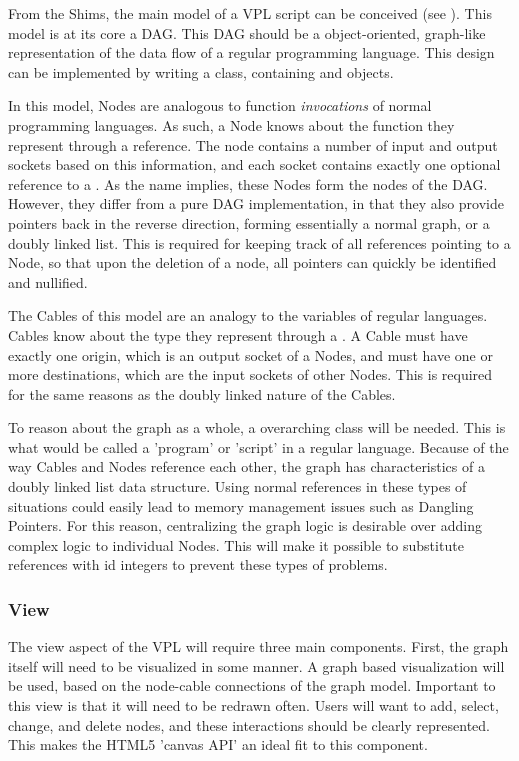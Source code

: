 From the Shims, the main model of a VPL script can be conceived (see ). 
This model is at its core a \ac{DAG}. 
This \ac{DAG} should be a object-oriented, graph-like representation of the data flow of a regular programming language. 
This design can be implemented by writing a  class, containing  and  objects. 

In this model, Nodes are analogous to function \emph{invocations} of normal programming languages. 
As such, a Node knows about the function they represent through a  reference. 
The node contains a number of input and output sockets based on this information, and each socket contains exactly one optional reference to a .  
As the name implies, these Nodes form the nodes of the DAG. 
However, they differ from a pure DAG implementation, in that they also provide pointers back in the reverse direction, forming essentially a normal graph, or a doubly linked list. 
This is required for keeping track of all references pointing to a Node, so that upon the deletion of a node, all pointers can quickly be identified and nullified.

The Cables of this model are an analogy to the variables of regular languages. 
Cables know about the type they represent through a . 
A Cable must have exactly one origin, which is an output socket of a Nodes, 
and must have one or more destinations, which are the input sockets of other Nodes.
This is required for the same reasons as the doubly linked nature of the Cables. 
 
To reason about the graph as a whole, a overarching  class will be needed.
This is what would be called a 'program' or 'script' in a regular language. 
Because of the way Cables and Nodes reference each other, the graph has characteristics of a doubly linked list data structure. 
Using normal references in these types of situations could easily lead to memory management issues such as Dangling Pointers.
For this reason, centralizing the graph logic is desirable over adding complex logic to individual Nodes. 
This will make it possible to substitute references with id integers to prevent these types of problems. 



\subsubsection*{View}
\label{sec:method-view}

The view aspect of the VPL will require three main components. 
First, the graph itself will need to be visualized in some manner.
A graph based visualization will be used, based on the node-cable connections of the graph model. 
Important to this view is that it will need to be redrawn often. 
Users will want to add, select, change, and delete nodes, and these interactions should be clearly represented. 
This makes the HTML5 'canvas API' an ideal fit to this component.

